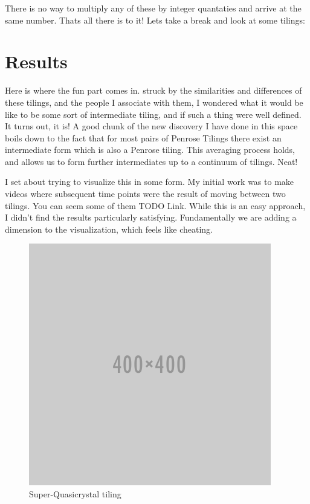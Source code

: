 \documentclass{amsart}
\begin{document}
There is no way to multiply any of these by integer quantaties and arrive at the same number. Thats all there is to it! Lets take a break and look at some tilings:

\section{Results}

Here is where the fun part comes in. struck by the similarities and differences of these tilings, and the people I
associate with them, I wondered what it would be like to be some sort of intermediate tiling, and if such a thing 
were well defined. It turns out, it is! A good chunk of the new discovery I have done in this space boils down to
the fact that for most pairs of Penrose Tilings there exist an intermediate form which is also a Penrose tiling.
This averaging process holds, and allows us to form further intermediates up to a continuum of tilings. Neat! 

I set about trying to visualize this in some form. My initial work was to make videos where subsequent time points were
the result of moving between two tilings. You can seem some of them TODO Link. While this is an easy approach, I didn’t
find the results particularly satisfying. Fundamentally we are adding a dimension to the visualization, which feels like
cheating.


\begin{figure}[h]
  \centering
  \includegraphics[width=0.8\linewidth]{figures/placeholder}
  \caption{Super-Quasicrystal tiling}
  \label{fig:gm-tiling}
\end{figure}
\end{document}
